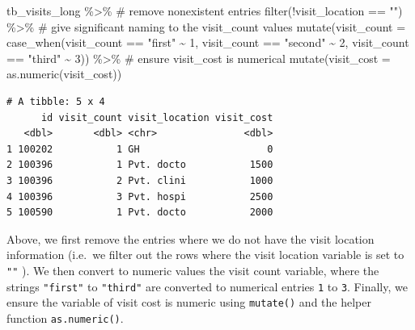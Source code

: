 \documentclass[
  letterpaper,
  DIV=11,
  numbers=noendperiod]{scrreprt}
\newenvironment{Shaded}{\begin{snugshade}}{\end{snugshade}}
\newcommand{\AttributeTok}[1]{\textcolor[rgb]{0.40,0.45,0.13}{#1}}
\newcommand{\CommentTok}[1]{\textcolor[rgb]{0.37,0.37,0.37}{#1}}
\newcommand{\DecValTok}[1]{\textcolor[rgb]{0.68,0.00,0.00}{#1}}
\newcommand{\FunctionTok}[1]{\textcolor[rgb]{0.28,0.35,0.67}{#1}}
\newcommand{\NormalTok}[1]{\textcolor[rgb]{0.00,0.23,0.31}{#1}}
\newcommand{\SpecialCharTok}[1]{\textcolor[rgb]{0.37,0.37,0.37}{#1}}
\newcommand{\StringTok}[1]{\textcolor[rgb]{0.13,0.47,0.30}{#1}}
\begin{document}
\begin{Shaded}
\begin{Highlighting}[]
\NormalTok{tb\_visits\_long }\SpecialCharTok{\%\textgreater{}\%} 
  \CommentTok{\# remove nonexistent entries}
  \FunctionTok{filter}\NormalTok{(}\SpecialCharTok{!}\NormalTok{visit\_location }\SpecialCharTok{==} \StringTok{""}\NormalTok{) }\SpecialCharTok{\%\textgreater{}\%} 
  \CommentTok{\# give significant naming to the visit\_count values}
  \FunctionTok{mutate}\NormalTok{(}\AttributeTok{visit\_count =} \FunctionTok{case\_when}\NormalTok{(visit\_count }\SpecialCharTok{==} \StringTok{"first"} \SpecialCharTok{\textasciitilde{}} \DecValTok{1}\NormalTok{, }
\NormalTok{                                 visit\_count }\SpecialCharTok{==} \StringTok{"second"} \SpecialCharTok{\textasciitilde{}} \DecValTok{2}\NormalTok{, }
\NormalTok{                                 visit\_count }\SpecialCharTok{==} \StringTok{"third"} \SpecialCharTok{\textasciitilde{}} \DecValTok{3}\NormalTok{)) }\SpecialCharTok{\%\textgreater{}\%} 
  \CommentTok{\# ensure visit\_cost is numerical}
  \FunctionTok{mutate}\NormalTok{(}\AttributeTok{visit\_cost =} \FunctionTok{as.numeric}\NormalTok{(visit\_cost))}
\end{Highlighting}
\end{Shaded}

\begin{verbatim}
# A tibble: 5 x 4
      id visit_count visit_location visit_cost
   <dbl>       <dbl> <chr>               <dbl>
1 100202           1 GH                      0
2 100396           1 Pvt. docto           1500
3 100396           2 Pvt. clini           1000
4 100396           3 Pvt. hospi           2500
5 100590           1 Pvt. docto           2000
\end{verbatim}

Above, we first remove the entries where we do not have the visit
location information (i.e.~we filter out the rows where the visit
location variable is set to \texttt{""} ). We then convert to numeric
values the visit count variable, where the strings \texttt{"first"} to
\texttt{"third"} are converted to numerical entries \texttt{1} to
\texttt{3}. Finally, we ensure the variable of visit cost is numeric
using \texttt{mutate()} and the helper function \texttt{as.numeric()}.
\end{document}
